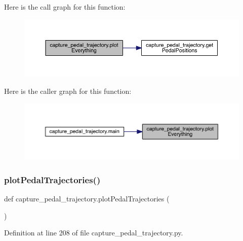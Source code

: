 Here is the call graph for this function\+:\nopagebreak
\begin{figure}[H]
\begin{center}
\leavevmode
\includegraphics[width=350pt]{namespacecapture__pedal__trajectory_a54694682225635fb5a735f159e9f059c_cgraph}
\end{center}
\end{figure}
Here is the caller graph for this function\+:\nopagebreak
\begin{figure}[H]
\begin{center}
\leavevmode
\includegraphics[width=350pt]{namespacecapture__pedal__trajectory_a54694682225635fb5a735f159e9f059c_icgraph}
\end{center}
\end{figure}
\mbox{\label{namespacecapture__pedal__trajectory_ab92d9c5ee601a8497311ab922392e027}} 
\subsubsection{\texorpdfstring{plotPedalTrajectories()}{plotPedalTrajectories()}}
{\footnotesize\ttfamily def capture\+\_\+pedal\+\_\+trajectory.\+plot\+Pedal\+Trajectories (\begin{DoxyParamCaption}{ }\end{DoxyParamCaption})}



Definition at line 208 of file capture\+\_\+pedal\+\_\+trajectory.\+py.



